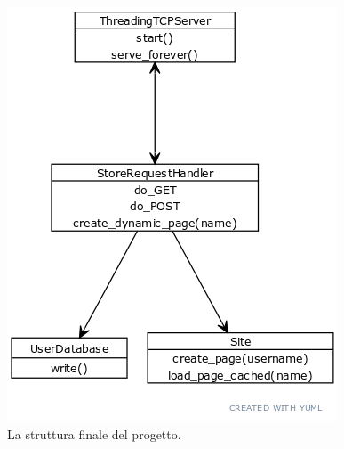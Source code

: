 \documentclass[a4paper,12pt]{report}
\begin{document}
\begin{figure}[h]
\centering{}
\includegraphics[]{uml2.png}
\caption{La struttura finale del progetto.}
\label{img:uml_classes}
\end{figure}
\end{document}
